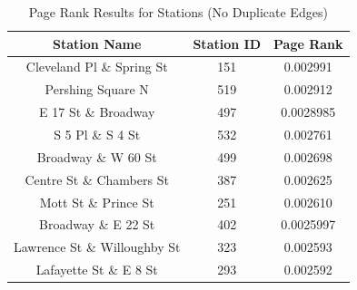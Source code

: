 \documentclass{article}
\begin{document}
 \begin{table}[h!]
\caption{Page Rank Results for Stations (No Duplicate Edges)}
\centering
 \begin{tabular}{||c c c||} 
 \hline
 Station Name & Station ID & Page Rank \\ [0.5ex] 
 \hline\hline
 Cleveland Pl \& Spring St & 151 & 0.002991\\ 
 Pershing Square N & 519 & 0.002912\\
 E 17 St \& Broadway & 497 & 0.0028985\\ 
  S 5 Pl \& S 4 St & 532 & 0.002761\\
 Broadway \& W 60 St & 499 & 0.002698\\
 Centre St \& Chambers St & 387 & 0.002625\\
 Mott St \& Prince St & 251 & 0.002610\\
 Broadway \& E 22 St & 402 & 0.0025997\\
 Lawrence St \& Willoughby St & 323 & 0.002593\\
 Lafayette St \& E 8 St & 293 & 0.002592\\[1ex] 
 \hline
 \end{tabular}
 \end{table}
\end{document}
